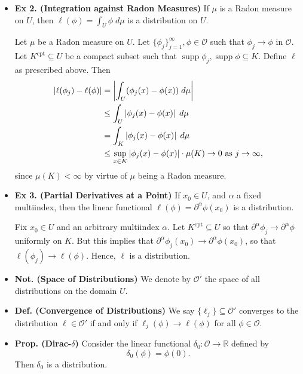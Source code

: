 \documentclass{article}
\begin{document}
\begin{itemize}
	\item \textbf{Ex 2. (Integration against Radon Measures)} 	If $\mu$ is a Radon measure on $U$, then $\ell(\phi) = \int_{U}\phi\;d\mu$ is a distribution on $U$. 
	
	{\color{orange}
		Let $\mu$ be a Radon measure on $U$. Let $\{\phi_{j}\}_{j = 1}^{\infty}, \phi \in \mathcal{O}$ such that $\phi_{j} \to \phi$ in $\mathcal{O}$. Let $K^{\text{cpt}} \subseteq U$ be a compact subset such that $\operatorname{supp}{\phi_{j}}, \operatorname{supp}{\phi} \subseteq K$. Define $\ell$ as prescribed above. Then 
			\begin{align}
				\begin{split}
					\left| \ell(\phi_{j}) - \ell(\phi) \right| &= \left| \int_{U}(\phi_{j}(x) - \phi(x)) \;d\mu \right| \\
					&\leq \int_{U}\left| \phi_{j}(x) - \phi(x) \right|\;d\mu \\
					&= \int_{K}\left| \phi_{j}(x) - \phi(x) \right|\;d\mu \\
					&\leq \sup_{x \in K}|\phi_{j}(x) - \phi(x)| \cdot \mu(K) \to 0 \text{ as $j \to \infty$}, 
				\end{split}
			\end{align}
		since $\mu(K) <\infty$ by virtue of $\mu$ being a Radon measure. 
	}
	
	\item \textbf{Ex 3. (Partial Derivatives at a Point)} If $x_{0} \in U$, and $\alpha$ a fixed multiindex, then the linear functional $\ell(\phi) = \partial^{\alpha}\phi(x_{0})$ is a distribution. 
	
	{\color{orange}
		Fix $x_{0} \in U$ and an arbitrary multiindex $\alpha$. Let $K^{\text{cpt}} \subseteq U$ so that $\partial^{\alpha}\phi_{j} \to \partial^{\alpha}\phi$ uniformly on $K$. But this implies that $\partial^{\alpha}\phi_{j}(x_{0}) \to \partial^{\alpha}\phi(x_{0})$, so that $\ell(\phi_{j}) \to\ell(\phi)$. Hence, $\ell$ is a distribution. 
	}
	
	\item \textbf{Not. (Space of Distributions)} We denote by $\mathcal{O}'$ the space of all distributions on the domain $U$. 
	
	\item \textbf{Def. (Convergence of Distributions)} We say $\{\ell_{j}\} \subseteq \mathcal{O}'$ converges to the distribution $\ell \in \mathcal{O}'$ if and only if $\ell_{j}(\phi) \to \ell(\phi)$ for all $\phi \in \mathcal{O}$. 
	
	\item \textbf{Prop. (Dirac-$\delta$)} Consider the linear functional $\delta_{0}: \mathcal{O} \to \mathbb{R}$ defined by 
		\begin{equation}
			\delta_{0}(\phi) = \phi(0). 
		\end{equation}
	Then $\delta_{0}$ is a distribution. 
	

\end{itemize}
\end{document}
